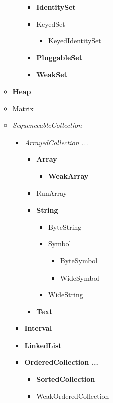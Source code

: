 \documentclass[a4paper,10pt,twoside]{book}
\begin{document}
\begin{figure}
\begin{center}
\begin{itemize}
\begin{itemize}
\begin{itemize}
\begin{itemize}
            \item{\textbf{IdentitySet}}
            \item{KeyedSet}
                \begin{itemize}
                \item{KeyedIdentitySet}
                \end{itemize}
            \item{\textbf{PluggableSet}}
            \item{\textbf{WeakSet}}
            \end{itemize}
        \end{itemize}
    \item{\textbf{Heap}}
    \item{Matrix}
    \item{\emph{SequenceableCollection}}
        \begin{itemize}
        \item{\emph{ArrayedCollection ...}}
            \begin{itemize}
            \item{\textbf{Array}}
                \begin{itemize}
                \item{\textbf{WeakArray}}
                \end{itemize}
            \item{RunArray}
            \item{\textbf{String}}
                \begin{itemize}
                \item{ByteString}
                \item{Symbol}
                    \begin{itemize}
                    \item{ByteSymbol}
                    \item{WideSymbol}
                    \end{itemize}
                \item{WideString}
                \end{itemize}
            \item{\textbf{Text}}
            \end{itemize}
        \item{\textbf{Interval}}
        \item{\textbf{LinkedList}}
        \item{\textbf{OrderedCollection ...}}
            \begin{itemize}
            \item{\textbf{SortedCollection}}
            \item{WeakOrderedCollection}
            \end{itemize}
        \end{itemize}
    \end{itemize}
\end{itemize}


\end{center}
\end{figure}
\end{document}
